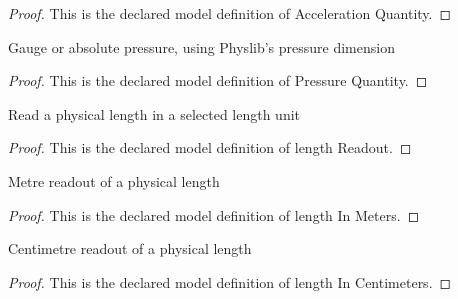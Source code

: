 \begin{proof}
  This is the declared model definition of Acceleration Quantity.
\end{proof}
\begin{definition}
  \label{def:physics:phyx-mini-0387:phyxminiproblems-problemphyxmini0387-pressurequantity}
  Gauge or absolute pressure, using Physlib's pressure dimension
\end{definition}
\begin{proof}
  This is the declared model definition of Pressure Quantity.
\end{proof}
\begin{definition}
  \label{def:physics:phyx-mini-0387:phyxminiproblems-problemphyxmini0387-lengthreadout}
  Read a physical length in a selected length unit
\end{definition}
\begin{proof}
  This is the declared model definition of length Readout.
\end{proof}
\begin{definition}
  \label{def:physics:phyx-mini-0387:phyxminiproblems-problemphyxmini0387-lengthinmeters}
  Metre readout of a physical length
\end{definition}
\begin{proof}
  This is the declared model definition of length In Meters.
\end{proof}
\begin{definition}
  \label{def:physics:phyx-mini-0387:phyxminiproblems-problemphyxmini0387-lengthincentimeters}
  Centimetre readout of a physical length
\end{definition}
\begin{proof}
  This is the declared model definition of length In Centimeters.
\end{proof}
